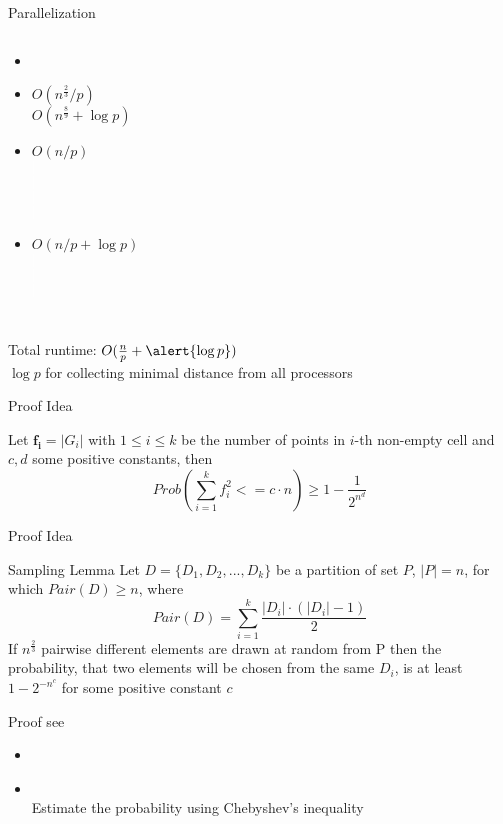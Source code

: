 \documentclass[18pt]{beamer}
\begin{document}
\begin{frame}{Parallelization}
\begin{columns}
		\begin{itemize}\itemsep0pt
			\item[]  
			\vspace{8pt}
			\item[]$O(n^{\frac{2}{3}}/p)$\\ $O(n^{\frac{8}{9}} + \log p)$ \\ 					
			\item[]$O(n/p)$\\\textcolor{white}{$|$} \\\textcolor{white}{$|$} \\ \textcolor{white}{$|$}\\  \textcolor{white}{$|$}\\
			\item[]$O(n/p + \log p)$\\\textcolor{white}{$|$} \\ \textcolor{white}{$|$} \\\textcolor{white}{$|$}\\
		\end{itemize}
\end{columns}
\vspace{2ex}
Total runtime: $O(\frac{n}{p} + \alert{\log p})$  \\
\hspace*{2em}$\log p$ for collecting minimal distance from all processors
\end{frame}

\begin{frame}{Proof Idea}
	\begin{theorem}
		Let $\boldsymbol{f_i} = |G_i|$ with $1\leq i \leq k$ be the number of points in $i$-th non-empty cell and $c, d$ some positive constants, then 
	$$Prob\left(\sum_{i=1}^k f_i^2 <= c \cdot n \right) \geq  1 - \frac{1}{2^{n^d}}$$
	\end{theorem}
\end{frame}

\begin{frame}{Proof Idea}
\begin{block}{Sampling Lemma}
Let $D = \{D_1, D_2,...,D_k\}$ be a partition of set $P$, $|P| = n$, for which $Pair(D) \geq n$, where
$$Pair(D) = \sum_{i=1}^k \frac{|D_i|\cdot (|D_i| - 1)}{2}$$ 
If $n^{\frac{2}{3}}$ pairwise different elements are drawn at random from P then the probability, that two elements will be chosen from the same $D_i$, is at least $1 - 2^{-n^c}$ for some positive constant $c$
\end{block}
Proof see
\begin{itemize}

\item \textbf{\cite{major}}
\item \textbf{\cite{dietzfelbinger1997reliable}} \\Estimate the probability using Chebyshev’s inequality
\end{itemize}

\end{frame}
\end{document}
